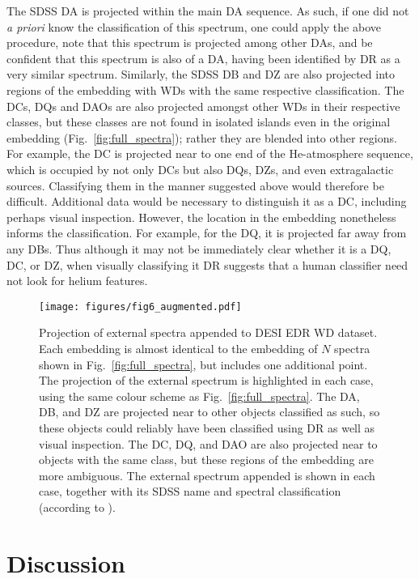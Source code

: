 \documentclass[fleqn,usenatbib]{mnras}
\begin{document}
The SDSS DA is projected within the main DA sequence.
As such, if one did not \textit{a priori} know the classification of this spectrum, one could apply the above procedure, note that this spectrum is projected among other DAs, and be confident that this spectrum is also of a DA, having been identified by DR as a very similar spectrum.
Similarly, the SDSS DB and DZ are also projected into regions of the embedding with WDs with the same respective classification.
The DCs, DQs and DAOs are also projected amongst other WDs in their respective classes, but these classes are not found in isolated islands even in the original embedding (Fig.~\ref{fig:full_spectra}); rather they are blended into other regions.
For example, the DC is projected near to one end of the He-atmosphere sequence, which is occupied by not only DCs but also DQs, DZs, and even extragalactic sources.
Classifying them in the manner suggested above would therefore be difficult.
Additional data would be necessary to distinguish it as a DC, including perhaps visual inspection.
However, the location in the embedding nonetheless informs the classification.
For example, for the DQ, it is projected far away from any DBs.
Thus although it may not be immediately clear whether it is a DQ, DC, or DZ, when visually classifying it DR suggests that a human classifier need not look for helium features.

\begin{figure*}
\texttt{[image: figures/fig6\_augmented.pdf]}
\caption{
    Projection of external spectra appended to DESI EDR WD dataset.
    Each embedding is almost identical to the embedding of $N$ spectra shown in Fig.~\ref{fig:full_spectra}, but includes one additional point.
    The projection of the external spectrum is highlighted in each case, using the same colour scheme as Fig.~\ref{fig:full_spectra}.
    The DA, DB, and DZ are projected near to other objects classified as such, so these objects could reliably have been classified using DR as well as visual inspection.
    The DC, DQ, and DAO are also projected near to objects with the same class, but these regions of the embedding are more ambiguous.
    The external spectrum appended is shown in each case, together with its SDSS name and spectral classification (according to \citealt{gentilefusillo19}).
}
\label{fig:external_spectra}
\end{figure*}



\section{Discussion}
\label{sec:discussion}
\end{document}
